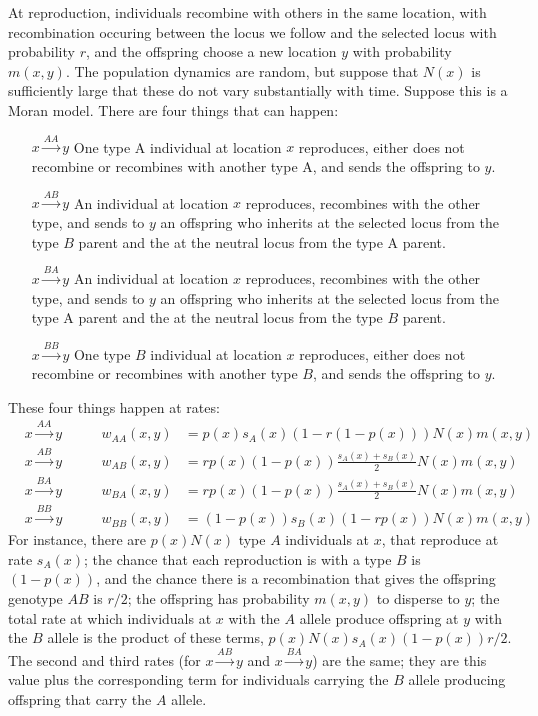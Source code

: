 \documentclass[11pt,letterpaper]{article}
\begin{document}
At reproduction, individuals recombine with others in the same location,
with recombination occuring between the locus we follow and the selected locus with probability $r$,
and the offspring choose a new location $y$ with probability $m(x,y)$.
The population dynamics are random, 
but suppose that $N(x)$ is sufficiently large that these do not vary substantially with time.
Suppose this is a Moran model.
There are four things that can happen:
\begin{enumerate}
    \item[$x\xrightarrow{AA}y$] One type A individual at location $x$ reproduces, 
        either does not recombine or recombines with another type A,
        and sends the offspring to $y$.
    \item[$x\xrightarrow{AB}y$] An individual at location $x$ reproduces, 
        recombines with the other type,
        and sends to $y$ an offspring
        who inherits at the selected locus from the type $B$ parent 
        and the at the neutral locus from the type A parent.
    \item[$x\xrightarrow{BA}y$] An individual at location $x$ reproduces, 
        recombines with the other type,
        and sends to $y$ an offspring
        who inherits at the selected locus from the type A parent 
        and the at the neutral locus from the type $B$ parent.
    \item[$x\xrightarrow{BB}y$] One type $B$ individual at location $x$ reproduces, 
        either does not recombine or recombines with another type $B$,
        and sends the offspring to $y$.
\end{enumerate}
These four things happen at rates:
\begin{align}
    & x\xrightarrow{AA}y & \qquad w_{AA}(x,y) &= p(x) s_A(x) \left(1 - r (1-p(x)) \right)  N(x) m(x,y) \\
    & x\xrightarrow{AB}y & \qquad w_{AB}(x,y) &= r p(x) (1-p(x)) \frac{s_A(x)+s_B(x)}{2} N(x) m(x,y) \\
    & x\xrightarrow{BA}y & \qquad w_{BA}(x,y) &= r p(x) (1-p(x)) \frac{s_A(x)+s_B(x)}{2} N(x) m(x,y) \\
    & x\xrightarrow{BB}y & \qquad w_{BB}(x,y) &= (1-p(x)) s_B(x) \left(1 - r p(x) \right) N(x) m(x,y) 
\end{align}
For instance,  
there are $p(x) N(x)$ type $A$ individuals at $x$, that reproduce at rate $s_A(x)$;
the chance that each reproduction is with a type $B$ is $(1-p(x))$, 
and the chance there is a recombination that gives the offspring genotype $AB$ is $r/2$;
the offspring has probability $m(x,y)$ to disperse to $y$;
the total rate at which individuals at $x$ with the $A$ allele produce offspring at $y$ with the $B$ allele is the product of these terms,
$p(x) N(x) s_A(x) (1-p(x)) r / 2$.
The second and third rates (for $x\xrightarrow{AB}y$ and $x\xrightarrow{BA}y$) are the same;
they are this value plus the corresponding term
for individuals carrying the $B$ allele producing offspring that carry the $A$ allele.
\end{document}
